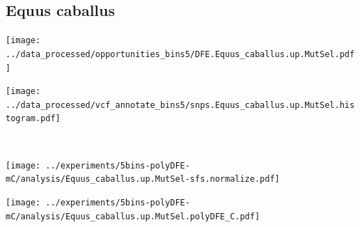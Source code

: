 \subsection{Equus caballus}

\begin{minipage}{0.49\linewidth}
    \texttt{[image: ../data\_processed/opportunities\_bins5/DFE.Equus\_caballus.up.MutSel.pdf]}
\end{minipage}
\begin{minipage}{0.49\linewidth}
    \texttt{[image: ../data\_processed/vcf\_annotate\_bins5/snps.Equus\_caballus.up.MutSel.histogram.pdf]}
\end{minipage}
\\
\begin{minipage}{0.49\linewidth}
    \texttt{[image: ../experiments/5bins-polyDFE-mC/analysis/Equus\_caballus.up.MutSel-sfs.normalize.pdf]}
\end{minipage}
\begin{minipage}{0.4\linewidth}
    \texttt{[image: ../experiments/5bins-polyDFE-mC/analysis/Equus\_caballus.up.MutSel.polyDFE\_C.pdf]}
\end{minipage}
